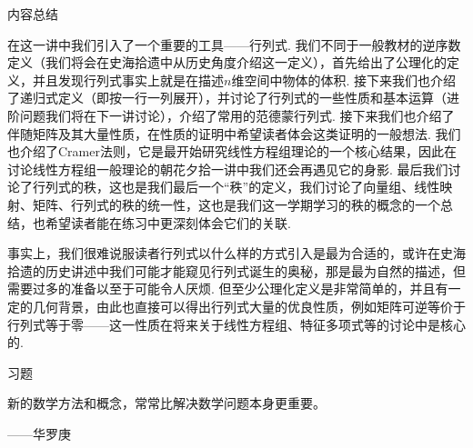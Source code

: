 \vspace{2ex}
\centerline{\heiti \Large 内容总结}

在这一讲中我们引入了一个重要的工具——行列式. 我们不同于一般教材的逆序数定义（我们将会在史海拾遗中从历史角度介绍这一定义），首先给出了公理化的定义，并且发现行列式事实上就是在描述$n$维空间中物体的体积. 接下来我们也介绍了递归式定义（即按一行一列展开），并讨论了行列式的一些性质和基本运算（进阶问题我们将在下一讲讨论），介绍了常用的范德蒙行列式. 接下来我们也介绍了伴随矩阵及其大量性质，在性质的证明中希望读者体会这类证明的一般想法. 我们也介绍了Cramer法则，它是最开始研究线性方程组理论的一个核心结果，因此在讨论线性方程组一般理论的朝花夕拾一讲中我们还会再遇见它的身影. 最后我们讨论了行列式的秩，这也是我们最后一个``秩''的定义，我们讨论了向量组、线性映射、矩阵、行列式的秩的统一性，这也是我们这一学期学习的秩的概念的一个总结，也希望读者能在练习中更深刻体会它们的关联.

事实上，我们很难说服读者行列式以什么样的方式引入是最为合适的，或许在史海拾遗的历史讲述中我们可能才能窥见行列式诞生的奥秘，那是最为自然的描述，但需要过多的准备以至于可能令人厌烦. 但至少公理化定义是非常简单的，并且有一定的几何背景，由此也直接可以得出行列式大量的优良性质，例如矩阵可逆等价于行列式等于零——这一性质在将来关于线性方程组、特征多项式等的讨论中是核心的.

\vspace{2ex}
\centerline{\heiti \Large 习题}

\vspace{2ex}
{\kaishu 新的数学方法和概念，常常比解决数学问题本身更重要。}
\begin{flushright}
    \kaishu
    ——华罗庚
\end{flushright}

